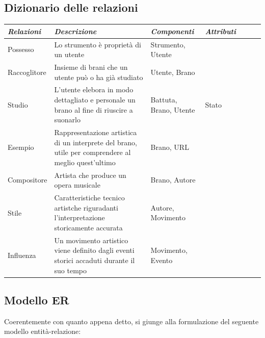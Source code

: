 \documentclass{article}
\begin{document}
    \subsection{Dizionario delle relazioni}

    \begin{tabular}{l p{5cm} p{3cm} p{2cm} l l l}
        \toprule
        \textbf{\textit{Relazioni}} & \textbf{\textit{Descrizione}} & \textbf{\textit{Componenti}} & \textbf{\textit{Attributi}} \\
        \midrule
        Possesso & Lo strumento è proprietà di un utente & Strumento, \newline Utente & \\
        \midrule
        Raccoglitore & Insieme di brani che un utente può o ha già studiato & Utente, \newline Brano & \\
        \midrule
        Studio & L'utente elebora in modo dettagliato e personale un brano al fine di riuscire a suonarlo & Battuta, \newline  Brano, \newline Utente & Stato \\
        \midrule
        Esempio & Rappresentazione artistica di un interprete del brano, utile per comprendere al meglio quest'ultimo & Brano, \newline URL & \\
        \midrule
        Compositore & Artista che produce un opera musicale & Brano, \newline Autore & \\
        \midrule
        Stile & Caratteristiche tecnico artistche riguradanti l'interpretazione storicamente accurata & Autore, \newline Movimento \\
        \midrule
        Influenza & Un movimento artistico viene definito dagli eventi storici accaduti durante il suo tempo & Movimento, \newline Evento & \\
        \bottomrule
    \end{tabular}

    \newpage

    \subsection{Modello ER}

    Coerentemente con quanto appena detto, si giunge alla formulazione del seguente modello entità-relazione:
\end{document}
